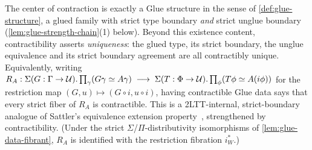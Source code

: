 \begin{remark}\label{rem:strong-glue-eep}
	The center of contraction is exactly a Glue structure in
	the sense of \cref{def:glue-structure}, a glued family with strict type
	boundary \emph{and} strict unglue boundary
	(\cref{lem:glue-strength-chain}(1) below). Beyond this existence content,
	contractibility asserts \emph{uniqueness}: the glued type, its strict
	boundary, the unglue equivalence and its strict boundary agreement are all
	contractibly unique.
	Equivalently, writing
	$R_A:\Sigma(G:\Gamma\to\mathcal{U}).\prod_\gamma(G\gamma\simeq A\gamma)\;\longrightarrow\;\Sigma(T:\Phi\to\mathcal{U}).\prod_\phi(T\phi\simeq A(i\phi))$
	for the restriction map $(G,u)\mapsto(G\circ i,u\circ i)$, having
	contractible Glue data says that every strict fiber of $R_A$ is
	contractible.
%	
	This is a 2LTT-internal, strict-boundary analogue of Sattler's equivalence extension property~\citep[Sec.~5]{Sattler2017}, strengthened by contractibility.
	(Under the strict
	$\Sigma$/$\Pi$-distributivity isomorphisms of \cref{lem:glue-data-fibrant},
	$R_A$ is identified with the restriction fibration $i^*_W$.)
\end{remark}

